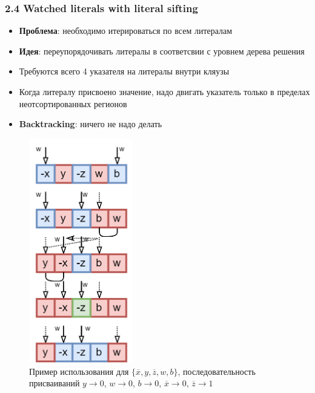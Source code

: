 \documentclass[aspectratio=169,xcolor=table,english]{beamer}
\begin{document}
\begin{frame}[fragile] \frametitle{2.4 Watched literals with literal sifting}
    \begin{minipage}[m]{0.55\linewidth}
        \begin{itemize}
            \item \textbf{Проблема}: необходимо итерироваться по всем литералам
            \item \textbf{Идея}: переупорядочивать литералы в соответсвии с уровнем дерева решения
            \item Требуются всего 4 указателя на литералы внутри кляузы
            \item Когда литералу присвоено значение, надо двигать указатель только в пределах неотсортированных регионов
            \item \textbf{Backtracking}: ничего не надо делать
        \end{itemize}
    \end{minipage}\hfill
    \begin{minipage}[m]{0.4\linewidth}
        \begin{figure}
            \centering
            \includegraphics[width=0.4\textwidth]{figures/watched literals sifting.png}
            \caption{Пример использования для $\{\overline{x},y,\overline{z},w,b\}$, последовательность присваиваний $y \rightarrow 0$, $w \rightarrow 0$, $b \rightarrow 0$, $\overline{x} \rightarrow 0$, $\overline{z} \rightarrow 1$}
        \end{figure}
    \end{minipage}
\end{frame}
\end{document}
